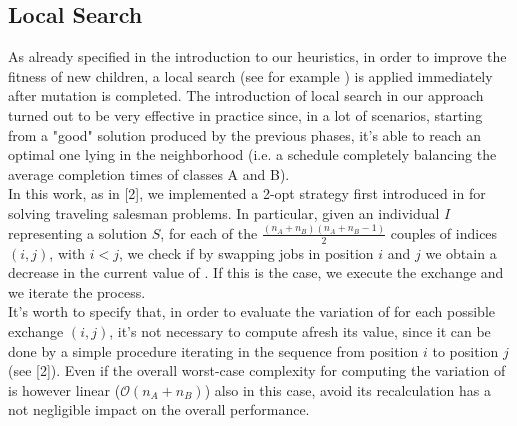 \documentclass[opre,nonblindrev]{informs3} %
\begin{document}
\subsection{Local Search}
As already specified in the introduction to our heuristics, in order to improve the fitness of new children, a local search (see for example \cite{local}) is applied immediately after mutation is completed. The introduction of local search in our approach turned out to be very effective in practice since, in a lot of scenarios, starting from a "good" solution produced by the previous phases, it's able to reach an optimal one lying in the neighborhood (i.e. a schedule completely balancing the average completion times of classes A and B).\\
In this work, as in [2], we implemented a 2-opt strategy first introduced in \cite{2-opt} for solving traveling salesman problems. In particular, given an individual $I$ representing a solution $S$, for each of the $\frac{(n_A+n_B)(n_A+n_B-1)}{2}$ couples of indices $(i,j)$, with $i<j$,  we check if by swapping jobs in position $i$ and $j$ we obtain a decrease in the current value of . If this is the case, we execute the exchange and we iterate the process.\\
It's worth to specify that, in order to evaluate the variation of  for each possible exchange $(i,j)$, it's not necessary to compute afresh its value, since it can be done by a simple procedure iterating in the sequence from position $i$ to position $j$ (see [2]). Even if the overall worst-case complexity for computing the variation of  is however linear ($\mathcal{O}(n_A+n_B)$) also in this case, avoid its recalculation has a not negligible impact on the overall performance.
\end{document}
